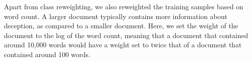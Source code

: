 \documentclass[11pt,a4paper]{article}
\begin{document}
Apart from class reweighting, we also reweighted the training samples based on word count. A larger document typically contains more information about deception, as compared to a smaller document. Here, we set the weight of the document to the log of the word count, meaning that a document that contained around 10,000 words would have a weight set to twice that of a document that contained around 100 words.



\end{document}
